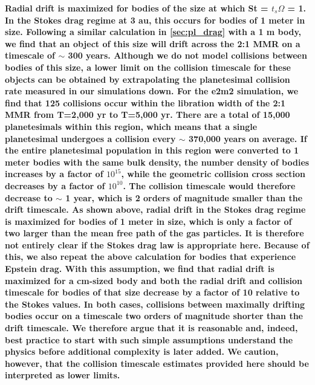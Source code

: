 \documentclass[fleqn,usenatbib]{mnras}
\begin{document}
\textbf{Radial drift is maximized for bodies of the size at which St = $t_{s} \Omega$ = 1. In the Stokes drag regime at 3 au, this occurs for bodies of 1 meter in size. Following a similar 
calculation in \ref{sec:pl_drag} with a 1 m body, we find that an object of this size will drift across the 2:1 MMR on a timescale of $\sim$ 300 years. Although we do not model collisions 
between bodies of this size, a lower limit on the collision timescale for these objects can be obtained by extrapolating the planetesimal collision rate measured in our simulations down. For 
the e2m2 simulation, we find that 125 collisions occur within the libration width of the 2:1 MMR from T=2,000 yr to  T=5,000 yr. There are a total of 15,000 planetesimals within this region, 
which means that a single planetesimal undergoes a collision every $\sim$ 370,000 years on average. If the entire planetesimal population in this region were converted to 1 meter bodies 
with the same bulk density, the number density of bodies increases by a factor of $10^{15}$, while the geometric collision cross section decreases by a factor of $10^{10}$. The collision 
timescale would therefore decrease to $\sim$ 1 year, which is 2 orders of magnitude smaller than the drift timescale. As shown above, radial drift in the Stokes drag regime is maximized 
for bodies of 1 meter in size, which is only a factor of two larger than the mean free path of the gas particles. It is therefore not entirely clear if the Stokes drag law is appropriate here. 
Because of this, we also repeat the above calculation for bodies that experience Epstein drag. With this assumption, we find that radial drift is maximized for a cm-sized body and both the 
radial drift and collision timescale for bodies of that size decrease by a factor of 10 relative to the Stokes values. In both cases, collisions between maximally drifting bodies occur on a 
timescale two orders of magnitude shorter than the drift timescale. We therefore argue that it is reasonable and, indeed, best practice to start with such simple assumptions understand the 
physics before additional complexity is later added. We caution, however, that the collision timescale estimates provided here should be interpreted as lower limits.}
\end{document}
